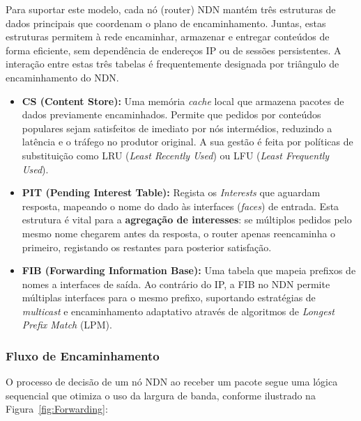 Para suportar este modelo, cada nó (router) NDN mantém três estruturas de dados principais que coordenam o plano de encaminhamento. Juntas, estas
estruturas permitem à rede encaminhar, armazenar e entregar conteúdos de forma eficiente, sem dependência
de endereços IP ou de sessões persistentes. A interação entre estas três tabelas é frequentemente
designada por triângulo de encaminhamento do NDN.

\begin{itemize}
    \item \textbf{\gls{CS} (Content Store):} Uma memória \textit{cache} local que armazena pacotes de dados previamente encaminhados. Permite que pedidos por conteúdos populares sejam satisfeitos de imediato por nós intermédios, reduzindo a latência e o tráfego no produtor original. A sua gestão é feita por políticas de substituição como LRU (\textit{Least Recently Used}) ou LFU (\textit{Least Frequently Used}).
    
    \item \textbf{\gls{PIT} (Pending Interest Table):} Regista os \textit{Interests} que aguardam resposta, mapeando o nome do dado às interfaces (\textit{faces}) de entrada. Esta estrutura é vital para a \textbf{agregação de interesses}: se múltiplos pedidos pelo mesmo nome chegarem antes da resposta, o router apenas reencaminha o primeiro, registando os restantes para posterior satisfação.
    
    \item \textbf{\gls{FIB} (Forwarding Information Base):} Uma tabela que mapeia prefixos de nomes a interfaces de saída. Ao contrário do IP, a FIB no NDN permite múltiplas interfaces para o mesmo prefixo, suportando estratégias de \textit{multicast} e encaminhamento adaptativo através de algoritmos de \textit{Longest Prefix Match} (LPM).
\end{itemize}



\subsubsection{Fluxo de Encaminhamento}

O processo de decisão de um nó NDN ao receber um pacote segue uma lógica sequencial que otimiza o uso da largura de banda, conforme ilustrado na Figura~\ref{fig:Forwarding}:

